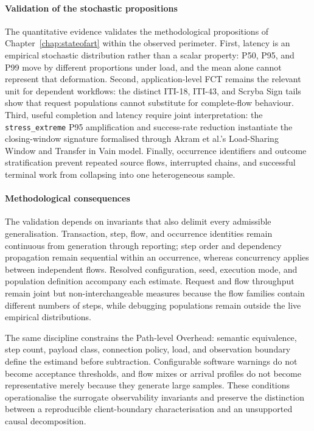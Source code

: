 \paragraph{Validation of the stochastic propositions}
\noindent The quantitative evidence validates the methodological propositions of
Chapter~\ref{chap:stateofart} within the observed perimeter. First, latency is
an empirical stochastic distribution rather than a scalar property: P50, P95,
and P99 move by different proportions under load, and the mean alone cannot
represent that deformation. Second, application-level FCT remains the relevant
unit for dependent workflows: the distinct ITI-18, ITI-43, and Scryba Sign
tails show that request populations cannot substitute for complete-flow
behaviour. Third, useful completion and latency require joint interpretation:
the \texttt{stress\_extreme} P95 amplification and success-rate reduction
instantiate the closing-window signature formalised through Akram et al.'s
Load-Sharing Window and Transfer in Vain model. Finally, occurrence identifiers
and outcome stratification prevent repeated source flows, interrupted chains,
and successful terminal work from collapsing into one heterogeneous sample.

\paragraph{Methodological consequences}
\noindent The validation depends on invariants that also delimit every admissible
generalisation. Transaction, step, flow, and occurrence identities remain
continuous from generation through reporting; step order and dependency
propagation remain sequential within an occurrence, whereas concurrency applies
between independent flows. Resolved configuration, seed, execution mode, and
population definition accompany each estimate. Request and flow throughput
remain joint but non-interchangeable measures because the flow families contain
different numbers of steps, while debugging populations remain outside the
live empirical distributions.

\noindent The same discipline constrains the Path-level Overhead: semantic
equivalence, step count, payload class, connection policy, load, and observation
boundary define the estimand before subtraction. Configurable software warnings
do not become acceptance thresholds, and flow mixes or arrival profiles do not
become representative merely because they generate large samples. These
conditions operationalise the surrogate observability invariants and preserve
the distinction between a reproducible client-boundary characterisation and an
unsupported causal decomposition.

